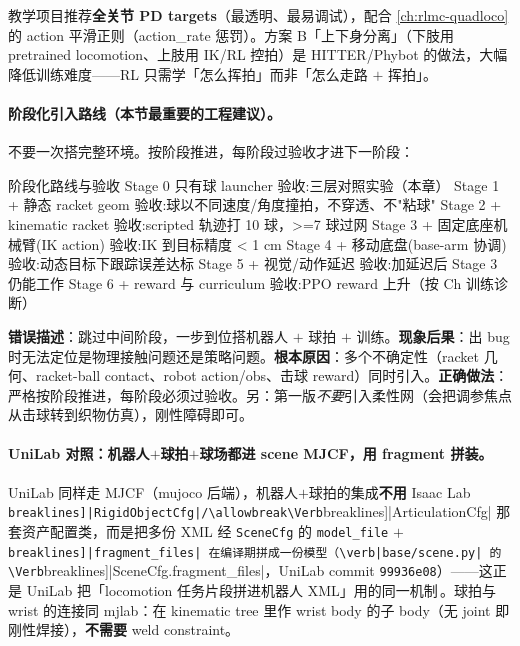 教学项目推荐\textbf{全关节 PD targets}（最透明、最易调试），配合 \cref{ch:rlmc-quadloco} 的 action 平滑正则（action\_rate 惩罚）。方案 B「上下身分离」（下肢用 pretrained locomotion、上肢用 IK/RL 控拍）是 HITTER/Phybot 的做法，大幅降低训练难度——RL 只需学「怎么挥拍」而非「怎么走路 $+$ 挥拍」。

\paragraph{阶段化引入路线（本节最重要的工程建议）。}不要一次搭完整环境。按阶段推进，每阶段过验收才进下一阶段：

\begin{codebox}[text]{阶段化路线与验收}
Stage 0  只有球 launcher              验收:三层对照实验（本章）
Stage 1  + 静态 racket geom          验收:球以不同速度/角度撞拍，不穿透、不"粘球"
Stage 2  + kinematic racket          验收:scripted 轨迹打 10 球，>=7 球过网
Stage 3  + 固定底座机械臂(IK action) 验收:IK 到目标精度 < 1 cm
Stage 4  + 移动底盘(base-arm 协调)    验收:动态目标下跟踪误差达标
Stage 5  + 视觉/动作延迟             验收:加延迟后 Stage 3 仍能工作
Stage 6  + reward 与 curriculum      验收:PPO reward 上升（按 Ch 训练诊断）
\end{codebox}

\begin{pitfall}
\textbf{错误描述}：跳过中间阶段，一步到位搭机器人 $+$ 球拍 $+$ 训练。\textbf{现象后果}：出 bug 时无法定位是物理接触问题还是策略问题。\textbf{根本原因}：多个不确定性（racket 几何、racket-ball contact、robot action/obs、击球 reward）同时引入。\textbf{正确做法}：严格按阶段推进，每阶段必须过验收。另：第一版\emph{不要}引入柔性网（会把调参焦点从击球转到织物仿真），刚性障碍即可。
\end{pitfall}

\paragraph{UniLab 对照：机器人$+$球拍$+$球场都进 scene MJCF，用 fragment 拼装。}UniLab 同样走 MJCF（mujoco 后端），机器人$+$球拍的集成\textbf{不用} Isaac Lab \Verb[breaklines]|RigidObjectCfg|/\allowbreak\Verb[breaklines]|ArticulationCfg| 那套资产配置类，而是把多份 XML 经 \verb|SceneCfg| 的 \verb|model_file| $+$ \Verb[breaklines]|fragment_files| 在编译期拼成一份模型（\verb|base/scene.py| 的 \Verb[breaklines]|SceneCfg.fragment_files|，UniLab commit \texttt{99936e08}）——这正是 UniLab 把「locomotion 任务片段拼进机器人 XML」用的同一机制\,\cite{unilab2026}。球拍与 wrist 的连接同 mjlab：在 kinematic tree 里作 wrist body 的子 body（无 joint 即刚性焊接），\textbf{不需要} weld constraint。

